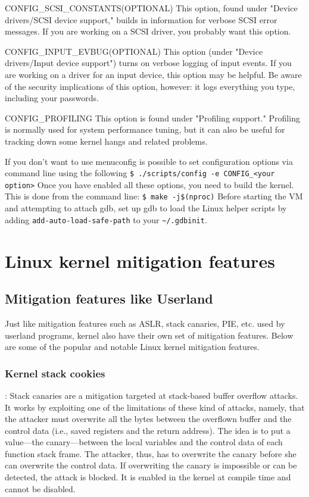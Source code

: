 \documentclass{masterthesis}
\begin{document}
CONFIG_SCSI_CONSTANTS(OPTIONAL)
This option, found under "Device drivers/SCSI device support," builds in information for verbose SCSI error messages. If you are working on a SCSI driver, you probably want this option.

CONFIG_INPUT_EVBUG(OPTIONAL)
This option (under "Device drivers/Input device support") turns on verbose logging of input events. If you are working on a driver for an input device, this option may be helpful. Be aware of the security implications of this option, however: it logs everything you type, including your passwords.

CONFIG_PROFILING
This option is found under "Profiling support." Profiling is normally used for system performance tuning, but it can also be useful for tracking down some kernel hangs and related problems.


If you don’t want to use menuconfig is possible to set configuration options via command line using the following
\lstinline{$ ./scripts/config -e CONFIG_<your option>}
Once you have enabled all these options, you need to build the kernel.
This is done from the command line:
\lstinline{$ make -j$(nproc)}
Before starting the VM and attempting to attach gdb, set up gdb to load the Linux helper scripts by adding \lstinline{add-auto-load-safe-path} to your \lstinline{~/.gdbinit}.

\chapter{Linux kernel mitigation features}
\label{ch:mitigation}
\section{Mitigation features like Userland}
\label{sect:like userland}
Just like mitigation features such as ASLR, stack canaries, PIE, etc. used by userland programs, kernel also have their own set of mitigation features. Below are some of the popular and notable Linux kernel mitigation features.

\subsection{Kernel stack cookies}:
\label{subsect:canary} 
Stack canaries are a mitigation targeted at stack-based buffer overflow attacks. It works by exploiting one of the limitations of these kind of attacks, namely, that the attacker must overwrite all the bytes between the overflown buffer and the control data (i.e., saved registers and the return address). The idea is to put a value—the canary—between the local variables and the control data of each function stack frame. The attacker, thus, has to overwrite the canary before she can overwrite the control data. If overwriting the canary is impossible or can be detected, the attack is blocked.
It is enabled in the kernel at compile time and cannot be disabled.
\end{document}

